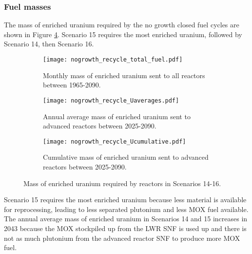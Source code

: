 \subsubsection{Fuel masses}
The mass of enriched uranium required by the no growth 
closed fuel cycles are shown in Figure \ref{fig:nogrowth_recycle_uranium}.
Scenario 15 requires the most enriched uranium, followed by 
Scenario 14, then Scenario 16. 

\begin{figure}[h!]
    \centering
    \begin{subfigure}[b]{0.45\textwidth}
        \centering
        \texttt{[image: nogrowth\_recycle\_total\_fuel.pdf]}
        \caption{Monthly mass of enriched uranium sent to all reactors 
        between 1965-2090.}
        \label{fig:nogrowth_recycle_all_uranium}
    \end{subfigure}
    \hfill
    \begin{subfigure}[b]{0.45\textwidth}
        \centering
        \texttt{[image: nogrowth\_recycle\_Uaverages.pdf]}
        \caption{Annual average mass of enriched uranium sent to 
        advanced reactors between 2025-2090.}
        \label{fig:nogrowth_recycle_AR_uranium}
    \end{subfigure}
    \begin{subfigure}[b]{0.45\textwidth}
        \centering
        \texttt{[image: nogrowth\_recycle\_Ucumulative.pdf]}
        \caption{Cumulative mass of enriched 
        uranium sent to advanced reactors between 2025-2090.}
        \label{fig:nogrowth_recycle_uranium_cumulative}
    \end{subfigure}
       \caption{Mass of enriched uranium required by reactors
        in Scenarios 14-16.}
       \label{fig:nogrowth_recycle_uranium}
\end{figure}

Scenario 15 requires the most enriched 
uranium because less material is available for reprocessing, leading to 
less separated plutonium and less \gls{MOX} fuel available. 
The annual average mass of enriched uranium in Scenarios 14 and 15 increases 
in 2043 because the \gls{MOX} stockpiled up from the \gls{LWR} \gls{SNF} 
is used up and there is not as much plutonium from the advanced reactor 
\gls{SNF} to produce more \gls{MOX} fuel. 

